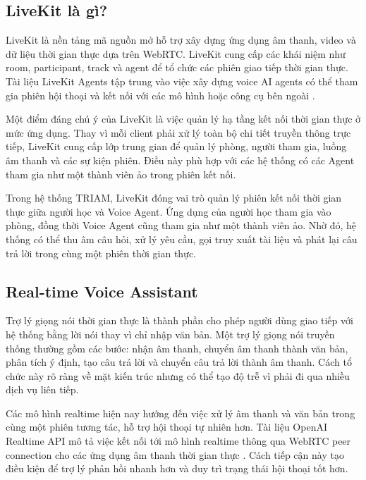 \documentclass[12pt,a4paper]{report}
\begin{document}
\subsection{LiveKit là gì?}

LiveKit là nền tảng mã nguồn mở hỗ trợ xây dựng ứng dụng âm thanh, video và dữ liệu thời gian thực dựa trên WebRTC. LiveKit cung cấp các khái niệm như room, participant, track và agent để tổ chức các phiên giao tiếp thời gian thực. Tài liệu LiveKit Agents tập trung vào việc xây dựng voice AI agents có thể tham gia phiên hội thoại và kết nối với các mô hình hoặc công cụ bên ngoài \cite{livekitDocs}.

Một điểm đáng chú ý của LiveKit là việc quản lý hạ tầng kết nối thời gian thực ở mức ứng dụng. Thay vì mỗi client phải xử lý toàn bộ chi tiết truyền thông trực tiếp, LiveKit cung cấp lớp trung gian để quản lý phòng, người tham gia, luồng âm thanh và các sự kiện phiên. Điều này phù hợp với các hệ thống có các Agent tham gia như một thành viên ảo trong phiên kết nối.

Trong hệ thống TRIAM, LiveKit đóng vai trò quản lý phiên kết nối thời gian thực giữa người học và Voice Agent. Ứng dụng của người học tham gia vào phòng, đồng thời Voice Agent cũng tham gia như một thành viên ảo. Nhờ đó, hệ thống có thể thu âm câu hỏi, xử lý yêu cầu, gọi truy xuất tài liệu và phát lại câu trả lời trong cùng một phiên thời gian thực.

\subsection{Real-time Voice Assistant}

Trợ lý giọng nói thời gian thực là thành phần cho phép người dùng giao tiếp với hệ thống bằng lời nói thay vì chỉ nhập văn bản. Một trợ lý giọng nói truyền thống thường gồm các bước: nhận âm thanh, chuyển âm thanh thành văn bản, phân tích ý định, tạo câu trả lời và chuyển câu trả lời thành âm thanh. Cách tổ chức này rõ ràng về mặt kiến trúc nhưng có thể tạo độ trễ vì phải đi qua nhiều dịch vụ liên tiếp.

Các mô hình realtime hiện nay hướng đến việc xử lý âm thanh và văn bản trong cùng một phiên tương tác, hỗ trợ hội thoại tự nhiên hơn. Tài liệu OpenAI Realtime API mô tả việc kết nối tới mô hình realtime thông qua WebRTC peer connection cho các ứng dụng âm thanh thời gian thực \cite{openaiRealtimeDocs}. Cách tiếp cận này tạo điều kiện để trợ lý phản hồi nhanh hơn và duy trì trạng thái hội thoại tốt hơn.
\end{document}
